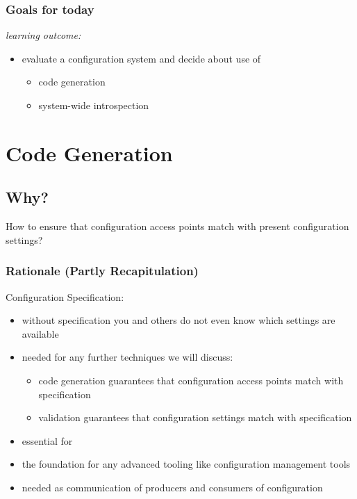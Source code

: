 \begin{frame}
	\frametitle{Goals for today}
	\textit{learning outcome:}
	\begin{itemize}
	\item evaluate a configuration system and decide about use of
	\begin{itemize}
	\item code generation
	\item system-wide introspection
	\end{itemize}
	\end{itemize}
\end{frame}

\section{Code Generation}

\subsection{Why?}

\begin{assignment}
	\begin{task}
	How to ensure that configuration access points match with present configuration settings?
	\end{task}
\end{assignment}

\begin{frame}
	\frametitle{Rationale (Partly Recapitulation)}
	Configuration Specification:
	\begin{itemize}
	\item without specification you and others do not even know which settings are available
	\item needed for any further techniques we will discuss:
		\begin{itemize}
		\color{red}
		\item code generation guarantees that configuration access points match with specification
		\item validation guarantees that configuration settings match with specification
		\end{itemize}
	\item essential for ~\citet{holland2001nofutz}
	\item the foundation for any advanced tooling like configuration management tools
	\item needed as communication of producers and consumers of configuration
	\end{itemize}
\end{frame}

